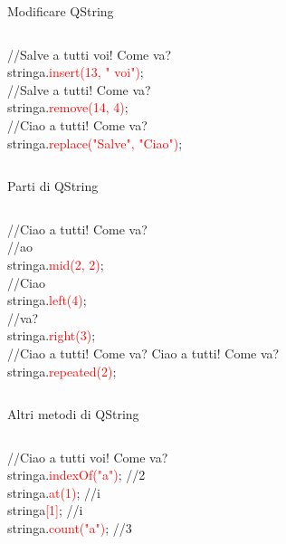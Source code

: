 \documentclass[10pt]{beamer}
\begin{document}
\begin{frame}{Modificare QString}
	\begin{columns}
		\begin{block}{}
			{\ttfamily //Salve a tutti voi! Come va?\\
				stringa.\textcolor{red}{insert(13, " voi")};\\
				\bigskip
				//Salve a tutti! Come va?\\
				stringa.\textcolor{red}{remove(14, 4)};\\
				\bigskip
				//Ciao a tutti! Come va?\\
				stringa.\textcolor{red}{replace("Salve", "Ciao")};}
		\end{block}
	\end{columns}
\end{frame}

\begin{frame}{Parti di QString}
	\begin{columns}
		\column{0.94\textwidth}
		\begin{block}{}
			{\ttfamily //Ciao a tutti! Come va?\\
				\bigskip
				//ao\\
				stringa.\textcolor{red}{mid(2, 2)};\\
				\bigskip
				//Ciao\\
				stringa.\textcolor{red}{left(4)};\\
				\bigskip
				//va?\\
				stringa.\textcolor{red}{right(3)};\\
				\bigskip
				//Ciao a tutti! Come va? Ciao a tutti! Come va?\\
				stringa.\textcolor{red}{repeated(2)};}
		\end{block}
	\end{columns}
\end{frame}

\begin{frame}{Altri metodi di QString}
	\begin{columns}
		\column{0.7\textwidth}
		\begin{block}{}
			{\ttfamily //Ciao a tutti voi! Come va?\\
				\bigskip
				stringa.\textcolor{red}{indexOf("a")}; //2\\
				\bigskip
				stringa.\textcolor{red}{at(1)}; //i\\
				\bigskip
				stringa\textcolor{red}{[1]}; //i\\
				\bigskip
				stringa.\textcolor{red}{count("a")}; //3}
		\end{block}
	\end{columns}
\end{frame}
\end{document}
